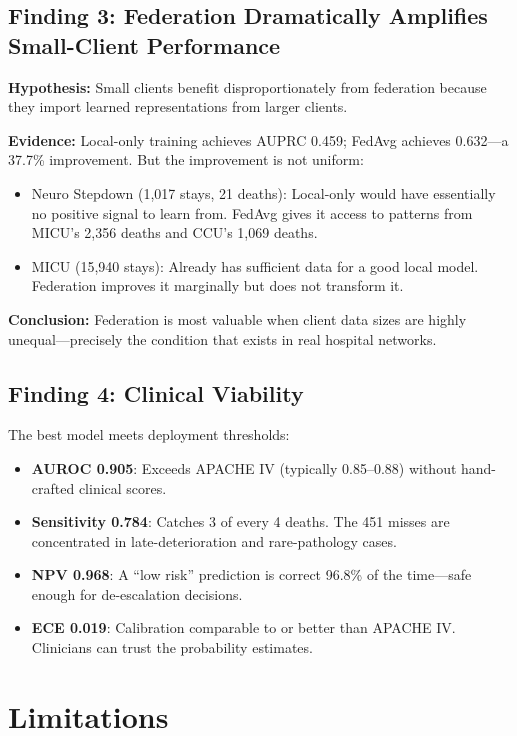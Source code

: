 \documentclass[11pt,a4paper]{report}
\begin{document}
\section{Finding 3: Federation Dramatically Amplifies Small-Client Performance}

\textbf{Hypothesis:} Small clients benefit disproportionately from federation because they import learned representations from larger clients.

\textbf{Evidence:} Local-only training achieves AUPRC 0.459; FedAvg achieves 0.632---a 37.7\% improvement. But the improvement is not uniform:
\begin{itemize}[leftmargin=2em]
\item Neuro Stepdown (1,017 stays, 21 deaths): Local-only would have essentially no positive signal to learn from. FedAvg gives it access to patterns from MICU's 2,356 deaths and CCU's 1,069 deaths.
\item MICU (15,940 stays): Already has sufficient data for a good local model. Federation improves it marginally but does not transform it.
\end{itemize}

\textbf{Conclusion:} Federation is most valuable when client data sizes are highly unequal---precisely the condition that exists in real hospital networks.

\section{Finding 4: Clinical Viability}

The best model meets deployment thresholds:
\begin{itemize}[leftmargin=2em]
\item \textbf{AUROC 0.905}: Exceeds APACHE IV (typically 0.85--0.88) without hand-crafted clinical scores.
\item \textbf{Sensitivity 0.784}: Catches 3 of every 4 deaths. The 451 misses are concentrated in late-deterioration and rare-pathology cases.
\item \textbf{NPV 0.968}: A ``low risk'' prediction is correct 96.8\% of the time---safe enough for de-escalation decisions.
\item \textbf{ECE 0.019}: Calibration comparable to or better than APACHE IV. Clinicians can trust the probability estimates.
\end{itemize}


\chapter{Limitations}
\end{document}
